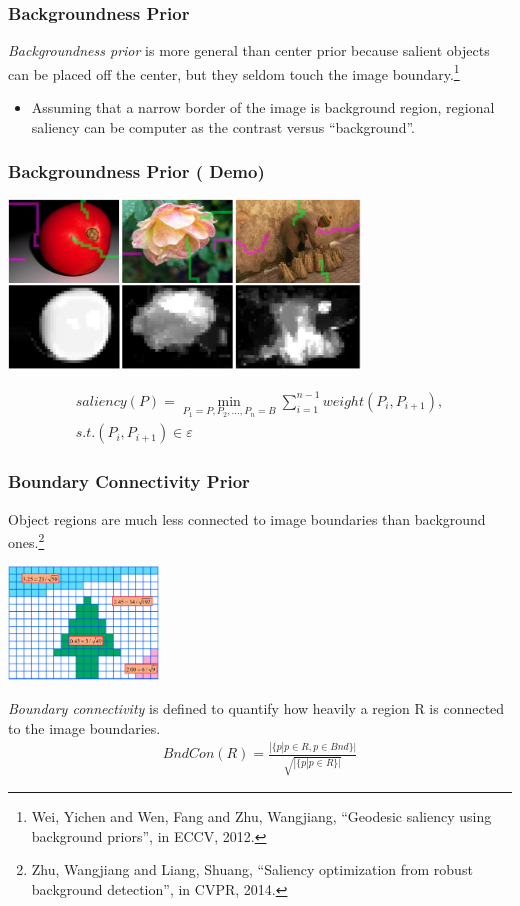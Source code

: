 \documentclass[notheorems,serif,table,compress]{beamer}  %
\begin{document}
\begin{frame}
\frametitle{{\color{magenta}} Backgroundness Prior}
{\color{blue}\emph{Backgroundness prior}} is more general than center prior because salient objects can be placed off the center, but they seldom touch the image boundary.\footnote{Wei, Yichen and Wen, Fang and Zhu, Wangjiang, ``Geodesic saliency using background priors'', in ECCV, 2012.}
\begin{itemize}
\item Assuming that a narrow border of the image is background region, regional saliency can be computer as the contrast versus ``background''.
\end{itemize}
\vspace{0.3in}
\end{frame}

\begin{frame}
\frametitle{{\color{magenta}} Backgroundness Prior (\color{yellow} \textbf{Demo})}
\centering\includegraphics[width=0.7\textwidth]{GS.png}

\begin{align}
saliency(P) = \min_{P_1=P, P_2, \ldots, P_n=B}\sum_{i=1}^{n-1}weight(P_i, P_{i+1}), \\
s.t.(P_i, P_{i+1})\in \varepsilon \nonumber
\end{align}
\end{frame}

\begin{frame}
\frametitle{{\color{magenta}} Boundary Connectivity Prior}
{\color{blue}Object regions are much less connected to image boundaries than background ones.}\footnote{Zhu, Wangjiang and Liang, Shuang, ``Saliency optimization from robust background detection'', in CVPR, 2014.}

\centering\includegraphics[width=4cm]{wCtr.png}

\emph{Boundary connectivity} is defined to quantify how heavily a region R is connected to the image boundaries.
\begin{align}
BndCon(R) = \frac{|\{p|p\in R, p\in Bnd\}|}{\sqrt{|\{p|p\in R\}|}}
\end{align}
\end{frame}
\end{document}
